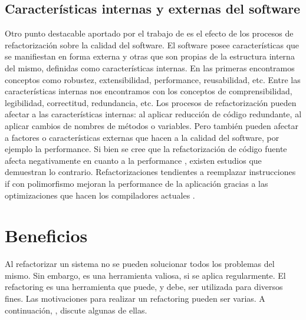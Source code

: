 \subsection{Características internas y externas del software}
Otro punto destacable aportado por el trabajo de \cite{REF06} es el efecto de los
procesos de refactorización sobre la calidad del software. El software posee características
que se manifiestan en forma externa y otras que son propias de la
estructura interna del mismo, definidas como características internas. En las
primeras encontramos conceptos como robustez, extensibilidad, performance,
reusabilidad, etc. Entre las características internas nos encontramos con
los conceptos de comprensibilidad, legibilidad, correctitud, redundancia, etc.
Los procesos de refactorización pueden afectar a las características internas:
al aplicar reducción de código redundante, al aplicar cambios de nombres de
métodos o variables. Pero también pueden afectar a factores o características
externas que hacen a la calidad del software, por ejemplo la performance. Si
bien se cree que la refactorización de código fuente afecta negativamente en
cuanto a la performance \cite{REF03}, existen estudios que demuestran lo contrario.
Refactorizaciones tendientes a reemplazar instrucciones if con polimorfismo
mejoran la performance de la aplicación gracias a las optimizaciones que hacen
los compiladores actuales \cite{REF06}.


\section{Beneficios}
Al refactorizar un sistema no se pueden solucionar todos los problemas del mismo. Sin
embargo, es una herramienta valiosa, si se aplica regularmente. El refactoring es una
herramienta que puede, y debe, ser utilizada para diversos fines. Las motivaciones para
realizar un refactoring pueden ser varias. A continuación, \cite{REF07}, discute algunas de ellas.


